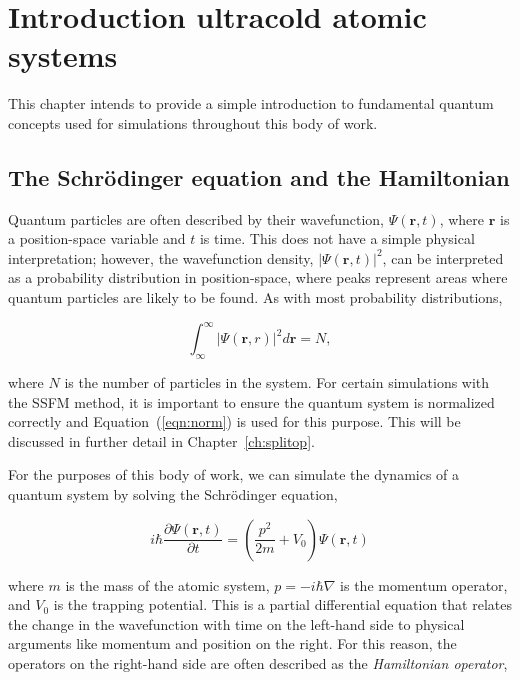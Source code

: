 \chapter{Introduction ultracold atomic systems}
\label{ch:qs}

This chapter intends to provide a simple introduction to fundamental quantum concepts used for simulations throughout this body of work.

\section{The Schr\"odinger equation and the Hamiltonian}
Quantum particles are often described by their wavefunction, $\Psi(\mathbf{r},t)$, where $\mathbf{r}$ is a position-space variable and $t$ is time.
This does not have a simple physical interpretation; however, the wavefunction density, $|\Psi(\mathbf{r},t)|^2$, can be interpreted as a probability distribution in position-space, where peaks represent areas where quantum particles are likely to be found.
As with most probability distributions,

\begin{equation}
    \label{eqn:norm}
    \int_\infty^\infty |\Psi(\mathbf{r},r)|^2 d\mathbf{r} = N,
\end{equation}

\noindent where $N$ is the number of particles in the system.
For certain simulations with the SSFM method, it is important to ensure the quantum system is normalized correctly and Equation~(\ref{eqn:norm}) is used for this purpose.
This will be discussed in further detail in Chapter~\ref{ch:splitop}.

For the purposes of this body of work, we can simulate the dynamics of a quantum system by solving the Schr\"odinger equation,

\begin{equation}
    i\hbar\frac{\partial\Psi(\mathbf{r},t)}{\partial t} = \left(\frac{p^2}{2m} + V_0\right) \Psi(\mathbf{r},t)
    \label{eqn:schrody}
\end{equation}

\noindent where $m$ is the mass of the atomic system, $p = -i\hbar\nabla$ is the momentum operator, and $V_0$ is the trapping potential.
This is a partial differential equation that relates the change in the wavefunction with time on the left-hand side to physical arguments like momentum and position on the right.
For this reason, the operators on the right-hand side are often described as the \textit{Hamiltonian operator}, 

